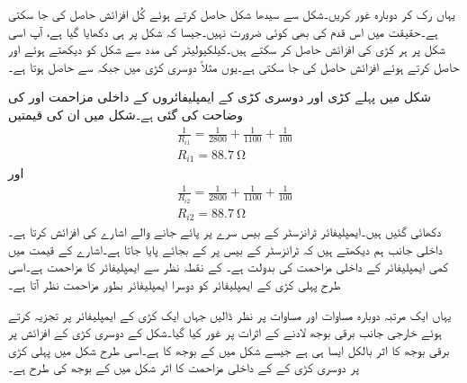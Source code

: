 یہاں رک کر دوبارہ غور کریں۔شکل  سے  سیدھا شکل  حاصل کرتے ہوئے کُل افزائش حاصل کی جا سکتی ہے۔حقیقت میں اس قدم کی بھی کوئی ضرورت نہیں۔جیسا کہ شکل  پر ہی دکھایا گیا ہے، آپ اسی شکل پر ہر کڑی کی افزائش  حاصل کر سکتے ہیں۔کیلکیولیٹر کی مدد سے شکل کو دیکھتے ہوئے  اور  حاصل کرتے ہوئے افزائش حاصل کی جا سکتی ہے۔یوں مثلاً دوسری کڑی میں  جبکہ  سے  حاصل ہوتا ہے۔

شکل  میں پہلے کڑی اور دوسری کڑی کے ایمپلیفائروں کے داخلی مزاحمت  اور  کی وضاحت کی گئی ہے۔شکل  میں ان کی قیمتیں
\begin{align*}
\frac{1}{R_{i1}}=\frac{1}{2800}+\frac{1}{1100}+\frac{1}{100}\\
R_{i1}=\SI{88.7}{\ohm}
\end{align*}
اور 
\begin{align*}
\frac{1}{R_{i2}}=\frac{1}{2800}+\frac{1}{1100}+\frac{1}{100}\\
R_{i2}=\SI{88.7}{\ohm}
\end{align*}
دکھائی گئیں ہیں۔ایمپلیفائر ٹرانزسٹر کے بیس سرے پر پائے جانے والے اشارے کی افزائش کرتا ہے۔داخلی جانب ہم دیکھتے ہیں کہ ٹرانزسٹر کے بیس پر  کے بجائے  پایا جاتا ہے۔اشارے کے قیمت میں کمی ایمپلیفائر کے داخلی مزاحمت  کی بدولت ہے۔ کے نقطہ نظر سے ایمپلیفائر  کا مزاحمت ہے۔اسی طرح پہلی کڑی کے ایمپلیفائر کو دوسرا ایمپلیفائر بطور مزاحمت  نظر آتا ہے۔

یہاں ایک مرتبہ دوبارہ مساوات  اور مساوات  پر نظر ڈالیں جہاں ایک کڑی کے ایمپلیفائر پر تجزیہ کرتے ہوئے خارجی جانب برقی بوجھ لادنے کے اثرات پر غور کیا گیا۔شکل  کے دوسری کڑی کے افزائش پر  برقی بوجھ کا اثر بالکل ایسا ہی ہے جیسے شکل  میں  کے بوجھ کا ہے۔اسی طرح شکل  میں پہلی کڑی پر دوسری کڑی کے   کے داخلی مزاحمت کا اثر شکل  میں  کے بوجھ کی طرح ہے۔  

